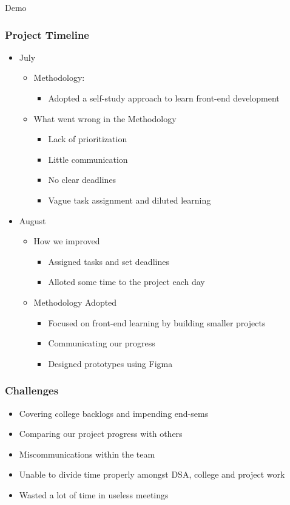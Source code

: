 \documentclass{beamer}
\begin{document}
\begin{frame}
    \center\Huge Demo
\end{frame}

\begin{frame}
\frametitle{Project Timeline}
\begin{itemize}
  \item July
  \begin{itemize}
    \item Methodology:
    \begin{itemize}
      \item Adopted a self-study approach to learn front-end development 
    \end{itemize}
    \item What went wrong in the Methodology
    \begin{itemize}
      \item Lack of prioritization
      \item Little communication
      \item No clear deadlines
      \item Vague task assignment and diluted learning
    \end{itemize}
  \end{itemize}
  \item August
  \begin{itemize}
    \item How we improved
    \begin{itemize}
      \item Assigned tasks and set deadlines
      \item Alloted some time to the project each day
    \end{itemize}
    \item Methodology Adopted
    \begin{itemize}
      \item Focused on front-end learning by building smaller projects
      \item Communicating our progress
      \item Designed prototypes using Figma
    \end{itemize}
  \end{itemize}

\end{itemize}
\end{frame}

\begin{frame}
  \frametitle{Challenges}
  \begin{itemize}
    \item Covering college backlogs and impending end-sems
    \item Comparing our project progress with others
    \item Miscommunications within the team
    \item Unable to divide time properly amongst DSA, college and project work
    \item Wasted a lot of time in useless meetings
  \end{itemize}
  \end{frame}
\end{document}
